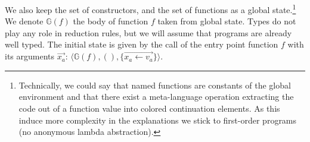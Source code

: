 \documentclass[a4paper,11pt]{article}
\newcommand\rtstate[3]{\langle #1, #2, #3\rangle}
\newcommand\yrg[1]{}%
\newcommand\gb[1]{}%
\begin{document}
We also keep the set of constructors, and the set of functions as a
global state.\footnote{Technically, we could say that named functions are constants of the global environment and that there exist a meta-language operation extracting the code out of a function value into colored continuation elements. As this induce more complexity in the explanations we stick to first-order programs (no anonymous lambda abstraction).}
\yrg{That global environment is hardly compatible with a
  higher-order language, right? That's fine because your language is
  first order. Yet, the introduction
  emphasizes that you chose a sublanguage of Rust to play with
  functional programs: this looks a bit contradictory.}\gb{See footnote. This paper is way too technical already. When I said that we chose Rust for functional behaviors, I was mostly thinking of algebraic datatypes and of the ``every piece of code yields a value'' idiom} We denote
$\mathbb{G}(f)$ the body of function $f$ taken from global
state. Types do not play any role in reduction rules, but we will
assume that programs are already well typed. The initial state is
given by the call of the entry point function $f$ with its arguments
$\overrightarrow{x_a}$:
$\rtstate{\mathbb{G}(f)}{()}{\{\overrightarrow{x_a \leftarrow
    v_a}\}}$.
\end{document}

